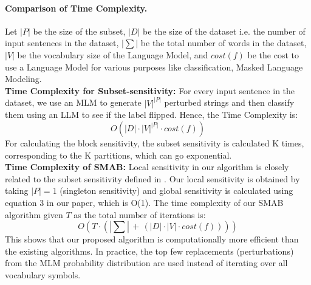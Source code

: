 \paragraph{Comparison of Time Complexity.} Let $|P|$ be the size of the subset, $|D|$ be the size of the dataset i.e. the number of input sentences in the dataset, $|\sum|$ be the total number of words in the dataset, $|V|$ be the vocabulary size of the Language Model, and $cost(f)$ be the cost to use a Language Model for various purposes like classification, Masked Language Modeling.\\
\textbf{Time Complexity for Subset-sensitivity:} For every input sentence in the dataset, we use an MLM to generate $|V|^{|P|}$ perturbed strings and then classify them using an LLM to see if the label flipped. Hence, the Time Complexity is:
\begin{equation}
    O(|D|\cdot |V|^{|P|} \cdot cost(f) )
\end{equation}
For calculating the block sensitivity, the subset sensitivity is calculated K times, corresponding to the K partitions, which can go exponential. \\
\textbf{Time Complexity of SMAB:} Local sensitivity in our algorithm is closely related to the subset sensitivity defined in \citet{hahn-etal-2021-sensitivity}. Our local sensitivity is obtained by taking $|P| = 1$ (singleton sensitivity) and global sensitivity is calculated using equation 3 in our paper, which is O(1). The time complexity of our SMAB algorithm given $T$ as the total number of iterations is:
\begin{equation}
    O(T\cdot (|\sum| \, + \, (|D| \cdot |V|\cdot cost(f))))
\end{equation}
This shows that our proposed algorithm is computationally more efficient than the existing algorithms.
In practice, the top few replacements (perturbations) from the MLM probability distribution are used instead of iterating over all vocabulary symbols.


